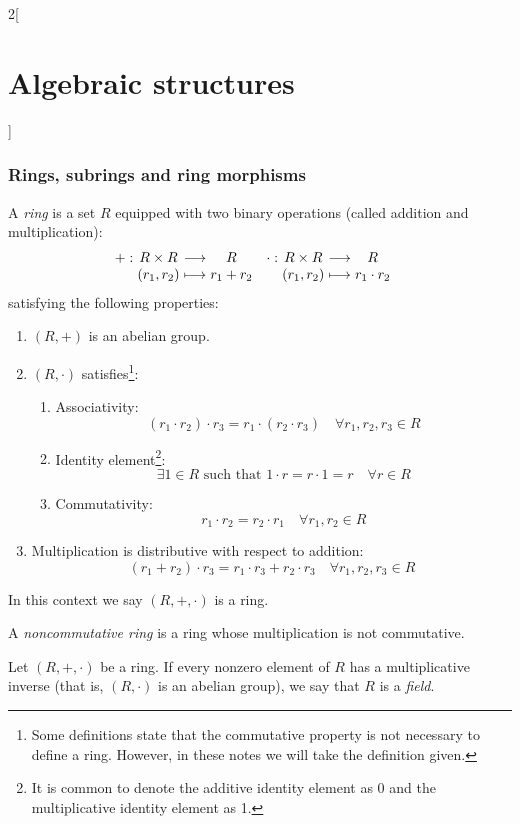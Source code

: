 \documentclass[../../../main_math.tex]{subfiles}
\begin{document}
\begin{multicols}{2}[\section{Algebraic structures}]
  \subsubsection{Rings, subrings and ring morphisms}
  \begin{definition}[Ring]
    A \emph{ring} is a set $R$ equipped with two binary operations (called addition and multiplication):
    \begin{align*}
      \function{+}{R\times R}{R}{(r_1,r_2)}{r_1+ r_2} & \function{\cdot}{R\times R}{R}{(r_1,r_2)}{r_1\cdot r_2}
    \end{align*}
    satisfying the following properties:
    \begin{enumerate}
      \item $(R,+)$ is an abelian group.
      \item $(R,\cdot)$ satisfies\footnote{Some definitions state that the commutative property is not necessary to define a ring. However, in these notes we will take the definition given.}:
            \begin{enumerate}
              \item Associativity: $$(r_1\cdot r_2)\cdot r_3=r_1\cdot(r_2\cdot r_3)\quad\forall r_1,r_2,r_3\in R$$
              \item Identity element\footnote{It is common to denote the additive identity element as 0 and the multiplicative identity element as 1.}: $$\exists 1\in R\text{ such that }1\cdot r=r\cdot 1=r\quad\forall r\in R$$
              \item Commutativity: $$r_1\cdot r_2=r_2\cdot r_1\quad\forall r_1,r_2\in R$$
            \end{enumerate}
      \item Multiplication is distributive with respect to addition: $$(r_1+r_2)\cdot r_3=r_1\cdot r_3+r_2\cdot r_3\quad\forall r_1,r_2,r_3\in R$$
    \end{enumerate}
    In this context we say $(R,+,\cdot)$ is a ring.
  \end{definition}
  \begin{definition}
    A \emph{noncommutative ring} is a ring whose multiplication is not commutative.
  \end{definition}
  \begin{definition}[Field]\label{AS_field}
    Let $(R,+,\cdot)$ be a ring. If every nonzero element of $R$ has a multiplicative inverse (that is, $(R,\cdot)$ is an abelian group), we say that $R$ is a \emph{field}.
  \end{definition}
  \begin{proposition}

\end{proposition}
\end{multicols}
\end{document}
